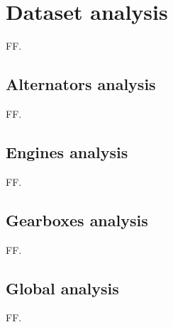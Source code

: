 \section{Dataset analysis}\label{sec:dataset-analysis}

FF.


\subsection{Alternators analysis}

FF.


\subsection{Engines analysis}

FF.


\subsection{Gearboxes analysis}

FF.


\subsection{Global analysis}

FF.
